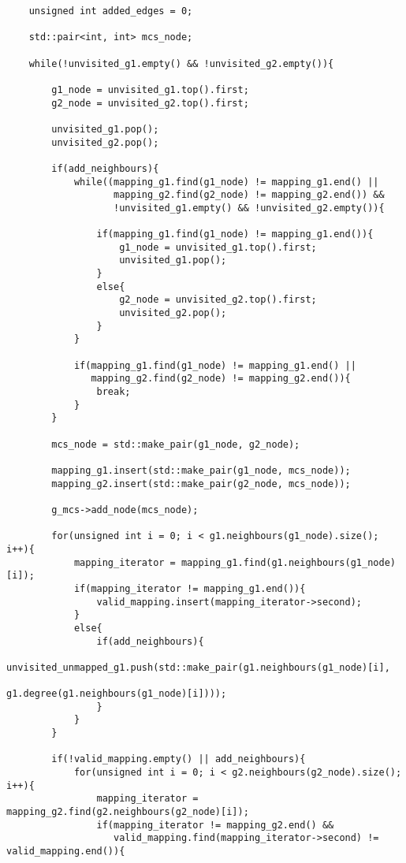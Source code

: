 \begin{lstlisting}
    unsigned int added_edges = 0;

    std::pair<int, int> mcs_node;

    while(!unvisited_g1.empty() && !unvisited_g2.empty()){

        g1_node = unvisited_g1.top().first;
        g2_node = unvisited_g2.top().first;

        unvisited_g1.pop();
        unvisited_g2.pop();

        if(add_neighbours){
            while((mapping_g1.find(g1_node) != mapping_g1.end() ||
                   mapping_g2.find(g2_node) != mapping_g2.end()) &&
                   !unvisited_g1.empty() && !unvisited_g2.empty()){

                if(mapping_g1.find(g1_node) != mapping_g1.end()){
                    g1_node = unvisited_g1.top().first;
                    unvisited_g1.pop();
                }
                else{
                    g2_node = unvisited_g2.top().first;
                    unvisited_g2.pop();
                }
            }

            if(mapping_g1.find(g1_node) != mapping_g1.end() ||
               mapping_g2.find(g2_node) != mapping_g2.end()){
                break;
            }
        }

        mcs_node = std::make_pair(g1_node, g2_node);

        mapping_g1.insert(std::make_pair(g1_node, mcs_node));
        mapping_g2.insert(std::make_pair(g2_node, mcs_node));

        g_mcs->add_node(mcs_node);

        for(unsigned int i = 0; i < g1.neighbours(g1_node).size(); i++){
            mapping_iterator = mapping_g1.find(g1.neighbours(g1_node)[i]);
            if(mapping_iterator != mapping_g1.end()){
                valid_mapping.insert(mapping_iterator->second);
            }
            else{
                if(add_neighbours){
                    unvisited_unmapped_g1.push(std::make_pair(g1.neighbours(g1_node)[i],
                                               g1.degree(g1.neighbours(g1_node)[i])));
                }
            }
        }

        if(!valid_mapping.empty() || add_neighbours){
            for(unsigned int i = 0; i < g2.neighbours(g2_node).size(); i++){
                mapping_iterator = mapping_g2.find(g2.neighbours(g2_node)[i]);
                if(mapping_iterator != mapping_g2.end() &&
                   valid_mapping.find(mapping_iterator->second) != valid_mapping.end()){


\end{lstlisting}

